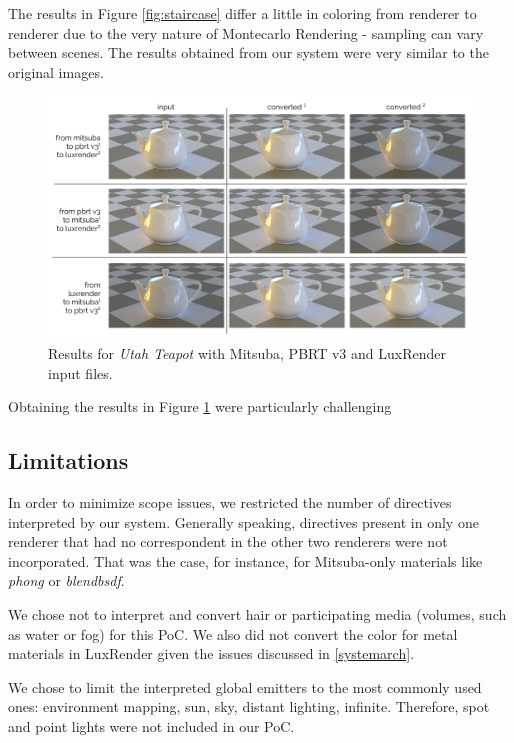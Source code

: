 The results in Figure \ref{fig:staircase} differ a little in coloring from 
renderer to renderer due to the very nature of Montecarlo Rendering - sampling 
can vary between scenes. The results obtained from our system were very similar 
to the original images.

\begin{figure}
\centering
\includegraphics[width=5in]{figs/4_results/results_teapot.png}
\caption{Results for \textit{Utah Teapot} with Mitsuba, PBRT v3 and LuxRender 
input files.}
\label{fig:teapot}
\end{figure}

Obtaining the results in Figure \ref{fig:teapot} were particularly challenging

\subsection{Limitations}
In order to minimize scope issues, we restricted the number of directives 
interpreted by our system. Generally speaking, directives present in only one 
renderer that had no correspondent in the other two renderers were not 
incorporated. That was the case, for instance, for Mitsuba-only materials like 
\textit{phong} or \textit{blendbsdf}. 

We chose not to interpret and convert hair or participating media (volumes, such 
as water or fog) for this PoC. We also did not convert the color for metal 
materials in LuxRender given the issues discussed in \ref{systemarch}.

We chose to limit the interpreted global emitters to the most commonly used 
ones: environment mapping, sun, sky, distant lighting, infinite. Therefore, spot 
and point lights were not included in our PoC.



